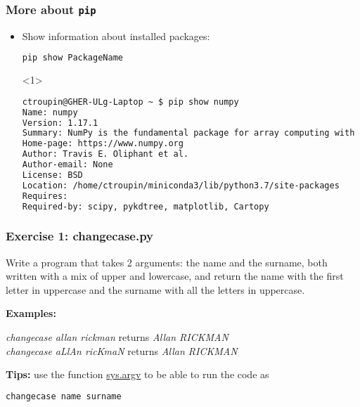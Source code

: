\begin{frame}[t, fragile]
\frametitle{More about \texttt{pip}}

\begin{itemize}
\item<1-> Show information about installed packages:
\begin{lstlisting}[language=bash]
pip show PackageName
\end{lstlisting}

\begin{onlyenv}<1>
\tiny
\begin{lstlisting}[language=bash]
ctroupin@GHER-ULg-Laptop ~ $ pip show numpy
Name: numpy
Version: 1.17.1
Summary: NumPy is the fundamental package for array computing with Python.
Home-page: https://www.numpy.org
Author: Travis E. Oliphant et al.
Author-email: None
License: BSD
Location: /home/ctroupin/miniconda3/lib/python3.7/site-packages
Requires: 
Required-by: scipy, pykdtree, matplotlib, Cartopy
\end{lstlisting}
\end{onlyenv}

\end{itemize}

\end{frame}


\begin{frame}[c, fragile]
\frametitle{Exercise 1: changecase.py}

\exercise

Write a program that takes 2 arguments: the name and the surname, both written with a mix of upper and lowercase, and return the name with the first letter in uppercase and the surname with all the letters in uppercase.

\textbf{Examples:}

\textit{changecase allan rickman} \hspace{1cm} returns \hspace{1cm}  \textit{Allan RICKMAN} \\
\textit{changecase aLlAn ricKmaN} \hspace{1cm} returns \hspace{1cm}  \textit{Allan RICKMAN} 

\vspace{1cm}

\textbf{Tips:} use the function \href{https://docs.python.org/2/library/sys.html#sys.argv}{sys.argv} to be able to run the code as 
\begin{lstlisting}[language=bash]
changecase name surname
\end{lstlisting}


\end{frame}

